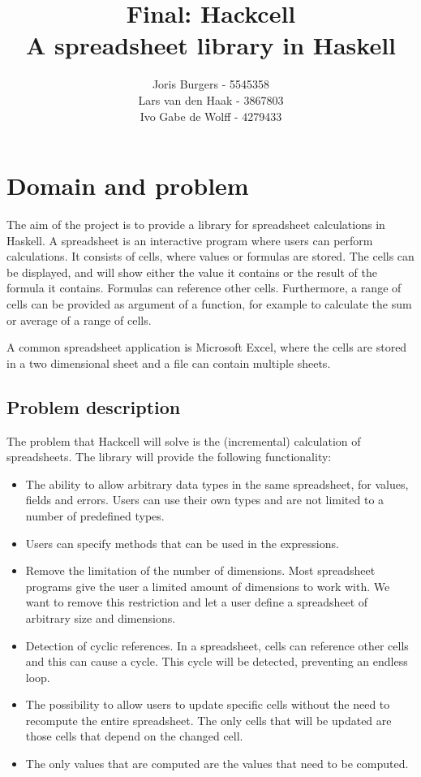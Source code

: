 \documentclass{article}
\title{
	Final: Hackcell \\
	\vskip 0.5cm
	\large{A spreadsheet library in Haskell}
}
\author{Joris Burgers - 5545358\\ Lars van den Haak - 3867803\\ Ivo Gabe de Wolff - 4279433}
\begin{document}
	\maketitle
	
	\section{Domain and problem}
	The aim of the project is to provide a library for spreadsheet calculations in Haskell. A spreadsheet is an interactive program where users can perform calculations. It consists of cells, where values or formulas are stored. The cells can be displayed, and will show either the value it contains or the result of the formula it contains. Formulas can reference other cells. Furthermore, a range of cells can be provided as argument of a function, for example to calculate the sum or average of a range of cells. 
	
	A common spreadsheet application is Microsoft Excel, where the cells are stored in a two dimensional sheet and a file can contain multiple sheets.
	
	\subsection{Problem description}
	The problem that Hackcell will solve is the (incremental) calculation of spreadsheets. The library will provide the following functionality:
	\begin{itemize}
		\item The ability to allow arbitrary data types in the same spreadsheet, for values, fields and errors. Users can use their own types and are not limited to a number of predefined types.
		\item Users can specify methods that can be used in the expressions.
		\item Remove the limitation of the number of dimensions. Most spreadsheet programs give the user a limited amount of dimensions to work with. We want to remove this restriction and let a user define a spreadsheet of arbitrary size and dimensions.
		\item Detection of cyclic references. In a spreadsheet, cells can reference other cells and this can cause a cycle. This cycle will be detected, preventing an endless loop.
		\item The possibility to allow users to update specific cells without the need to recompute the entire spreadsheet. The only cells that will be updated are those cells that depend on the changed cell.
		\item The only values that are computed are the values that need to be computed.
	\end{itemize}	
	
\end{document}

